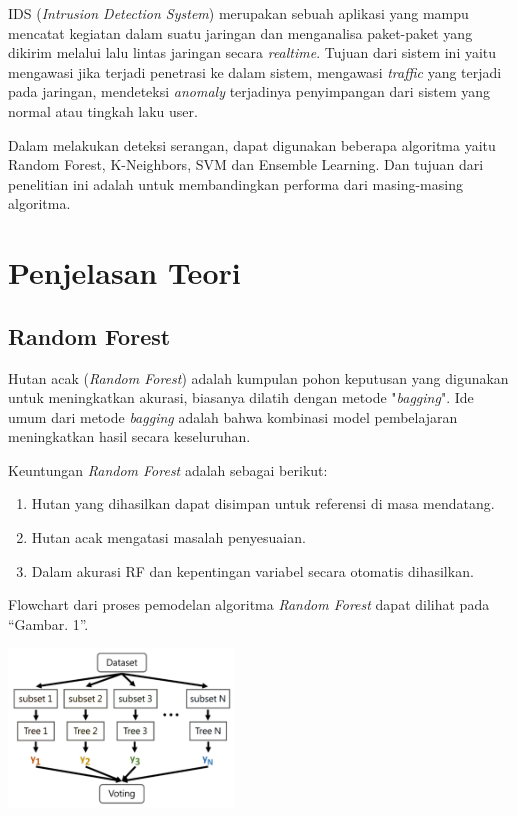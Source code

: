 \documentclass[conference]{IEEEtran}
\begin{document}
IDS (\emph{Intrusion Detection System}) merupakan sebuah aplikasi yang mampu mencatat kegiatan dalam suatu jaringan dan menganalisa paket-paket yang dikirim melalui lalu lintas jaringan secara \emph{realtime}. Tujuan dari sistem ini yaitu mengawasi jika terjadi penetrasi ke dalam sistem, mengawasi \emph{traffic} yang terjadi pada jaringan, mendeteksi \emph{anomaly} terjadinya penyimpangan dari sistem yang normal atau tingkah laku user.

Dalam melakukan deteksi serangan, dapat digunakan beberapa algoritma  yaitu Random Forest, K-Neighbors, SVM dan Ensemble Learning. Dan tujuan dari penelitian ini adalah untuk membandingkan performa dari masing-masing algoritma.

\section{Penjelasan Teori}

\subsection{Random Forest}

Hutan acak (\emph{Random Forest}) adalah kumpulan pohon keputusan yang digunakan untuk meningkatkan akurasi, biasanya dilatih dengan metode "\emph{bagging}". Ide umum dari metode \emph{bagging} adalah bahwa kombinasi model pembelajaran meningkatkan hasil secara keseluruhan.

Keuntungan \emph{Random Forest} adalah sebagai berikut\cite{farnaaz2016random}:

\begin{enumerate}
\item Hutan yang dihasilkan dapat disimpan untuk referensi di masa mendatang.
\item Hutan acak mengatasi masalah penyesuaian.
\item Dalam akurasi RF dan kepentingan variabel secara otomatis dihasilkan.
\end{enumerate}

Flowchart dari proses pemodelan algoritma \emph{Random Forest} dapat dilihat pada ``Gambar. 1''.\vspace{6pt}

\begin{minipage}{\linewidth}
\centerline{\includegraphics[width=60mm]{Gambar/Gbr001.jpg}}
\label{fig1}
\end{minipage}
\end{document}
